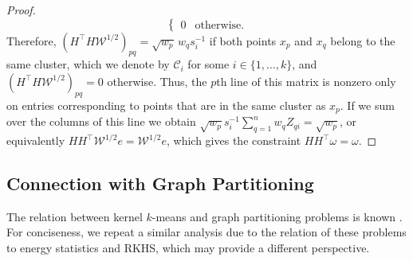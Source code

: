 \documentclass[aps,preprint,nofootinbib,floatfix]{revtex4-1}
\newcommand\C{{\mathcal{C}}}
\newcommand\e{e}
\newcommand\om{\omega}
\begin{document}
\begin{proof}
\begin{equation}
\begin{cases}
0 & \mbox{otherwise}.
\end{cases}
\end{equation}
Therefore, $(H^\top H \mathcal{W}^{1/2})_{pq} = \sqrt{w_p} \, w_q s_i^{-1}$
if both points $x_p$ and $x_q$ belong to the same cluster, which
we denote by $\C_i$ for some $i\in\{1,\dotsc,k\}$, and 
$(H^\top H \mathcal{W}^{1/2})_{pq} = 0 $ otherwise. Thus, the $p$th
line of this matrix is nonzero only on entries corresponding to points
that are in the same cluster as $x_p$. If we sum over the columns of this
line we obtain $\sqrt{w_p} s_i^{-1} \sum_{q=1}^n w_q Z_{qi} = \sqrt{w_p}$,
or equivalently $H H^\top \mathcal{W}^{1/2} \e = \mathcal{W}^{1/2} \e$,
which gives the constraint $H H^\top \om = \om$.
\end{proof}


\subsection*{Connection with Graph Partitioning}

The relation between kernel $k$-means and graph partitioning problems
is known \cite{Dhillon2,Dhillon}. For conciseness, we repeat a similar 
analysis due to the relation of these problems to
energy statistics and RKHS, which may provide a different perspective.
\end{document}
